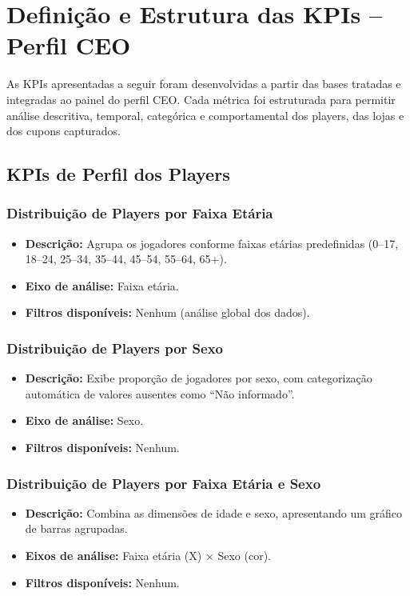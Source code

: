 \documentclass[12pt]{article}
\begin{document}
\section{Definição e Estrutura das KPIs – Perfil CEO}

As KPIs apresentadas a seguir foram desenvolvidas a partir das bases tratadas e integradas ao painel do perfil CEO. 
Cada métrica foi estruturada para permitir análise descritiva, temporal, categórica e comportamental dos players, das lojas e dos cupons capturados.

\subsection{KPIs de Perfil dos Players}

\subsubsection{Distribuição de Players por Faixa Etária}
\begin{itemize}
    \item \textbf{Descrição:} Agrupa os jogadores conforme faixas etárias predefinidas (0–17, 18–24, 25–34, 35–44, 45–54, 55–64, 65+).
    \item \textbf{Eixo de análise:} Faixa etária.
    \item \textbf{Filtros disponíveis:} Nenhum (análise global dos dados).
\end{itemize}

\subsubsection{Distribuição de Players por Sexo}
\begin{itemize}
    \item \textbf{Descrição:} Exibe proporção de jogadores por sexo, com categorização automática de valores ausentes como “Não informado”.
    \item \textbf{Eixo de análise:} Sexo.
    \item \textbf{Filtros disponíveis:} Nenhum.
\end{itemize}

\subsubsection{Distribuição de Players por Faixa Etária e Sexo}
\begin{itemize}
    \item \textbf{Descrição:} Combina as dimensões de idade e sexo, apresentando um gráfico de barras agrupadas.
    \item \textbf{Eixos de análise:} Faixa etária (X) × Sexo (cor).
    \item \textbf{Filtros disponíveis:} Nenhum.
\end{itemize}
\end{document}
